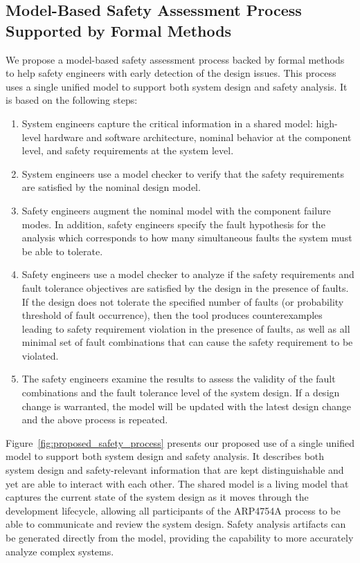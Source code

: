 \subsection{Model-Based Safety Assessment Process Supported by Formal Methods}
\label{sec:saProcess2}
We propose a model-based safety assessment process backed by formal methods to help safety engineers with early detection of the design issues.  This process uses a single unified model to support both system design and safety analysis. It is based on the following steps:

\begin{enumerate}
	\item System engineers capture the critical information in a shared %
	model:  high-level hardware and software architecture, nominal behavior at the component level, and safety requirements at the system level.%
	\item System engineers use a model checker to verify that the safety requirements are satisfied by the nominal design model. 
	\item Safety engineers augment the nominal model with the component failure modes. %
	In addition, safety engineers specify the fault hypothesis for the analysis which corresponds to how many simultaneous faults the system must be able to tolerate.
	\item Safety engineers use a model checker to analyze if the safety requirements and fault tolerance objectives are satisfied by the design in the presence of faults. %
	If the design does not tolerate the specified number of faults (or probability threshold of fault occurrence), then the tool produces counterexamples leading to safety requirement violation in the presence of faults, %
	 as well as all minimal set of fault combinations that can cause the safety requirement to be violated.
	\item The safety engineers examine the results to assess the validity of the fault combinations and the fault tolerance level of the system design. If a design change is warranted, the model will be updated with the latest design change and the above process is repeated.
\end{enumerate}

Figure~\ref{fig:proposed_safety_process} presents our proposed use of a single unified model to support both system design and safety analysis. It describes both system design and safety-relevant information that are kept distinguishable and yet are able to interact with each other. The shared model is a living model that captures the current state of the system design as it moves through the development lifecycle, allowing all participants of the ARP4754A process to be able to communicate and review the system design. Safety analysis artifacts can be generated directly from the model, providing the capability to more accurately analyze complex systems.

